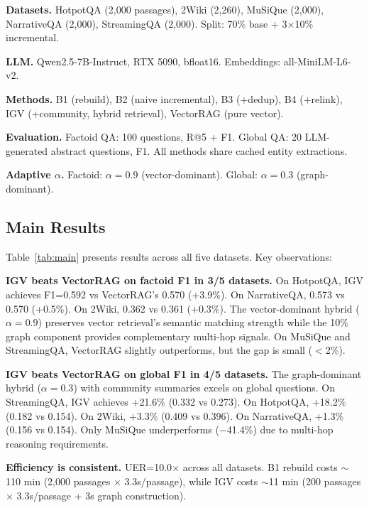 \documentclass[sigconf,anonymous,review]{acmart}
\begin{document}
\textbf{Datasets.} HotpotQA (2,000 passages), 2Wiki (2,260), MuSiQue (2,000), NarrativeQA (2,000), StreamingQA (2,000). Split: 70\% base + 3$\times$10\% incremental.

\textbf{LLM.} Qwen2.5-7B-Instruct, RTX 5090, bfloat16. Embeddings: all-MiniLM-L6-v2.

\textbf{Methods.} B1 (rebuild), B2 (naive incremental), B3 (+dedup), B4 (+relink), IGV (+community, hybrid retrieval), VectorRAG (pure vector).

\textbf{Evaluation.} Factoid QA: 100 questions, R@5 + F1. Global QA: 20 LLM-generated abstract questions, F1. All methods share cached entity extractions.

\textbf{Adaptive $\alpha$.} Factoid: $\alpha{=}0.9$ (vector-dominant). Global: $\alpha{=}0.3$ (graph-dominant).

\subsection{Main Results}

Table~\ref{tab:main} presents results across all five datasets. Key observations:

\textbf{IGV beats VectorRAG on factoid F1 in 3/5 datasets.} On HotpotQA, IGV achieves F1=0.592 vs VectorRAG's 0.570 (+3.9\%). On NarrativeQA, 0.573 vs 0.570 (+0.5\%). On 2Wiki, 0.362 vs 0.361 (+0.3\%). The vector-dominant hybrid ($\alpha{=}0.9$) preserves vector retrieval's semantic matching strength while the 10\% graph component provides complementary multi-hop signals. On MuSiQue and StreamingQA, VectorRAG slightly outperforms, but the gap is small ($<$2\%).

\textbf{IGV beats VectorRAG on global F1 in 4/5 datasets.} The graph-dominant hybrid ($\alpha{=}0.3$) with community summaries excels on global questions. On StreamingQA, IGV achieves +21.6\% (0.332 vs 0.273). On HotpotQA, +18.2\% (0.182 vs 0.154). On 2Wiki, +3.3\% (0.409 vs 0.396). On NarrativeQA, +1.3\% (0.156 vs 0.154). Only MuSiQue underperforms ($-$41.4\%) due to multi-hop reasoning requirements.

\textbf{Efficiency is consistent.} UER=10.0$\times$ across all datasets. B1 rebuild costs $\sim$110 min (2,000 passages $\times$ 3.3s/passage), while IGV costs $\sim$11 min (200 passages $\times$ 3.3s/passage + 3s graph construction).
\end{document}
